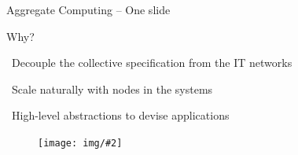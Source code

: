 \documentclass[presentation, 9pt, aspectratio=169]{beamer}\mode<presentation>{\usetheme{AMSBolognaFC}}
\newcommand{\lbl}[1]{\textbf{\textcolor{gray!90!white}{#1}}}
\newcommand{\imgv}[2]{
\begin{figure}
\centering
\texttt{[image: img/\#2]}
\end{figure}
}
\begin{document}
\begin{frame}{Aggregate Computing -- One slide}
{  \tiny {}%
  
  }{
  
  \begin{block}{\footnotesize Why?}
    \scriptsize
    
    {\bold{\faThumbsUp}} \, Decouple the collective specification from the IT networks  \vspace{0.1cm}
    
    {\bold{\faThumbsUp}} \, Scale naturally with nodes in the systems  \vspace{0.1cm}
     
    {\bold{\faThumbsUp}} \, High-level abstractions to devise applications
    
  \end{block}
  
  \begin{block}{} %
  \imgv{0.32}{layerss.pdf}
  \tiny {}
  \end{block}
  }
  
\end{frame}
\end{document}
